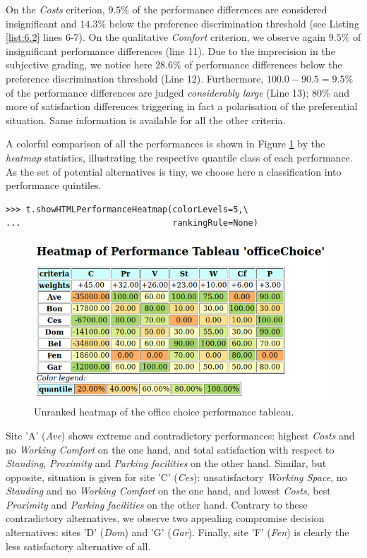 On the \emph{Costs} criterion, $9.5\%$ of the performance differences are considered insignificant and $14.3\%$ below the preference discrimination threshold (see Listing \ref{list:6.2} lines 6-7). On the qualitative \emph{Comfort} criterion, we observe again $9.5\%$ of insignificant performance differences (line 11). Due to the imprecision in the subjective grading, we notice here $28.6\%$ of performance differences below the preference discrimination threshold (Line 12). Furthermore, $100.0 - 90.5 = 9.5\%$ of the performance differences are judged \emph{considerably large} (Line 13); $80\%$ and more of satisfaction differences triggering in fact a polarisation of the preferential situation. Same information is available for all the other criteria. 
 
A colorful comparison of all the performances is shown in Figure \ref{fig:6.1} by the \emph{heatmap} statistics, illustrating the respective quantile class of each performance. As the set of potential alternatives is tiny, we choose here a classification into performance quintiles.
\begin{lstlisting}
>>> t.showHTMLPerformanceHeatmap(colorLevels=5,\
...                              rankingRule=None)
\end{lstlisting}
    \begin{figure}[h]
\includegraphics[width=11cm]{Figures/officeChoiceHeatmap.png}
\caption{Unranked heatmap of the office choice performance tableau.}
\label{fig:6.1}       %
\end{figure}

Site 'A' (\emph{Ave}) shows extreme and contradictory performances: highest \emph{Costs} and no \emph{Working Comfort} on the one hand, and total satisfaction with respect to \emph{Standing}, \emph{Proximity} and \emph{Parking facilities} on the other hand. Similar, but opposite, situation is given for site 'C' (\emph{Ces}): unsatisfactory \emph{Working Space}, no \emph{Standing} and no \emph{Working Comfort} on the one hand, and lowest \emph{Costs}, best \emph{Proximity} and \emph{Parking facilities} on the other hand. Contrary to these contradictory alternatives, we observe two appealing compromise decision alternatives: sites 'D' (\emph{Dom}) and 'G' (\emph{Gar}). Finally, site 'F' (\emph{Fen}) is clearly the less satisfactory alternative of all.

